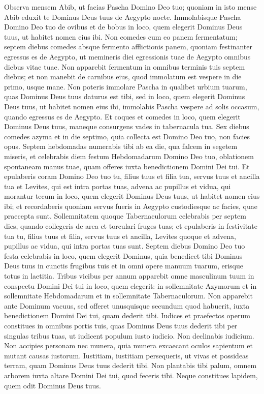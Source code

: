 \begin{biblechapter} 
\verse Observa mensem Abib, ut facias Pascha Domino Deo tuo; quoniam in isto mense Abib eduxit te Dominus Deus tuus de Aegypto nocte. 
\verse Immolabisque Pascha Domino Deo tuo de ovibus et de bobus in loco, quem elegerit Dominus Deus tuus, ut habitet nomen eius ibi. 
\verse Non comedes cum eo panem fermentatum; septem diebus comedes absque fermento afflictionis panem, quoniam festinanter egressus es de Aegypto, ut memineris diei egressionis tuae de Aegypto omnibus diebus vitae tuae. 
\verse Non apparebit fermentum in omnibus terminis tuis septem diebus; et non manebit de carnibus eius, quod immolatum est vespere in die primo, usque mane. 
\verse Non poteris immolare Pascha in qualibet urbium tuarum, quas Dominus Deus tuus daturus est tibi, 
\verse sed in loco, quem elegerit Dominus Deus tuus, ut habitet nomen eius ibi, immolabis Pascha vespere ad solis occasum, quando egressus es de Aegypto. 
\verse Et coques et comedes in loco, quem elegerit Dominus Deus tuus, maneque consurgens vades in tabernacula tua. 
\verse Sex diebus comedes azyma et in die septimo, quia collecta est Domino Deo tuo, non facies opus. 
\verse Septem hebdomadas numerabis tibi ab ea die, qua falcem in segetem miseris,  
\verse et celebrabis diem festum Hebdomadarum Domino Deo tuo, oblationem spontaneam manus tuae, quam offeres iuxta benedictionem Domini Dei tui. 
\verse Et epulaberis coram Domino Deo tuo tu, filius tuus et filia tua, servus tuus et ancilla tua et Levites, qui est intra portas tuas, advena ac pupillus et vidua, qui morantur tecum in loco, quem elegerit Dominus Deus tuus, ut habitet nomen eius ibi; 
\verse et recordaberis quoniam servus fueris in Aegypto custodiesque ac facies, quae praecepta sunt. 
\verse Sollemnitatem quoque Tabernaculorum celebrabis per septem dies, quando collegeris de area et torculari fruges tuas; 
\verse et epulaberis in festivitate tua tu, filius tuus et filia, servus tuus et ancilla, Levites quoque et advena, pupillus ac vidua, qui intra portas tuas sunt. 
\verse Septem diebus Domino Deo tuo festa celebrabis in loco, quem elegerit Dominus, quia benedicet tibi Dominus Deus tuus in cunctis frugibus tuis et in omni opere manuum tuarum, erisque totus in laetitia. 
\verse Tribus vicibus per annum apparebit omne masculinum tuum in conspectu Domini Dei tui in loco, quem elegerit: in sollemnitate Azymorum et in sollemnitate Hebdomadarum et in sollemnitate Tabernaculorum. Non apparebit ante Dominum vacuus, 
\verse sed offeret unusquisque secundum quod habuerit, iuxta benedictionem Domini Dei tui, quam dederit tibi. 
\verse Iudices et praefectos operum constitues in omnibus portis tuis, quas Dominus Deus tuus dederit tibi per singulas tribus tuas, ut iudicent populum iusto iudicio. 
\verse Non declinabis iudicium. Non accipies personam nec munera, quia munera excaecant oculos sapientum et mutant causas iustorum. 
\verse Iustitiam, iustitiam persequeris, ut vivas et possideas terram, quam Dominus Deus tuus dederit tibi. 
\verse Non plantabis tibi palum, omnem arborem iuxta altare Domini Dei tui, quod feceris tibi. 
\verse Neque constitues lapidem, quem odit Dominus Deus tuus. 
\end{biblechapter}

